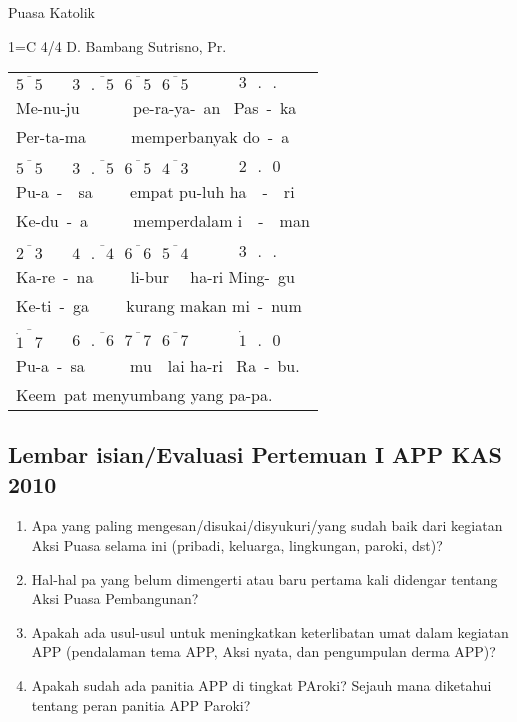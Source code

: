 \documentclass[a5paper,headsepline,titlepage,11pt,nnormalheadings,DIVcalc]{scrbook}
\begin{document}
\newpage

\begin{center}
Puasa Katolik
\end{center}

1=C 4/4 \hspace{3cm} D. Bambang Sutrisno, Pr.


\begin{tabular}{l|l|l}
$\overline{5~~~5}~$&$~3~~~\overline{.~~~5}~~~\overline{6~~~5}~~~\overline{6~~~5}~~$&$~~3~~~.~~~.$\\
\multicolumn{3}{l}{Me-nu-ju ~~~~~~pe-ra-ya-~an ~Pas~-~ka}\\
\multicolumn{3}{l}{Per-ta-ma ~~~~~memperbanyak do~-~a}\\
\\
$\overline{5~~~5}~$&$~3~~~\overline{.~~~5}~~~\overline{6~~~5}~~~\overline{4~~~3}~~$&$~~2~~~.~~~0$\\
\multicolumn{3}{l}{Pu-a~-~~sa ~~~~empat pu-luh ha~~-~~ri}\\
\multicolumn{3}{l}{Ke-du~-~a ~~~~~memperdalam i~~-~~man}\\
\\
$\overline{2~~~3}~$&$~4~~~\overline{.~~~4}~~~\overline{6~~~6}~~~\overline{5~~~4}~~$&$~~3~~~.~~~.$\\
\multicolumn{3}{l}{Ka-re~-~na ~~~~li-bur ~~ha-ri Ming-~gu}\\
\multicolumn{3}{l}{Ke-ti~-~ga ~~~~kurang makan mi~-~num}\\
\\
$\overline{\dot{1}~~~7}~$&$~6~~~\overline{.~~~6}~~~\overline{7~~~7}~~~\overline{6~~~7}~~$&$~~\dot{1}~~~.~~~0~~~~~$\\
\multicolumn{3}{l}{Pu-a~-~sa ~~~~~mu~~lai ha-ri ~Ra~-~bu.}\\
\multicolumn{3}{l}{Keem~pat menyumbang yang pa-pa.}\\

\end{tabular}

\subsection*{Lembar isian/Evaluasi Pertemuan I APP KAS 2010}
\begin{enumerate}
\item Apa yang paling mengesan/disukai/disyukuri/yang sudah baik dari kegiatan Aksi Puasa selama ini (pribadi, keluarga, lingkungan, paroki, dst)?

\item Hal-hal pa yang belum dimengerti atau baru pertama kali didengar tentang Aksi Puasa Pembangunan?

\item Apakah ada usul-usul untuk meningkatkan keterlibatan umat dalam kegiatan APP (pendalaman tema APP, Aksi nyata, dan pengumpulan derma APP)?

\item Apakah sudah ada panitia APP di tingkat PAroki? Sejauh mana diketahui tentang peran panitia APP Paroki?

\end{enumerate}
\end{document}
